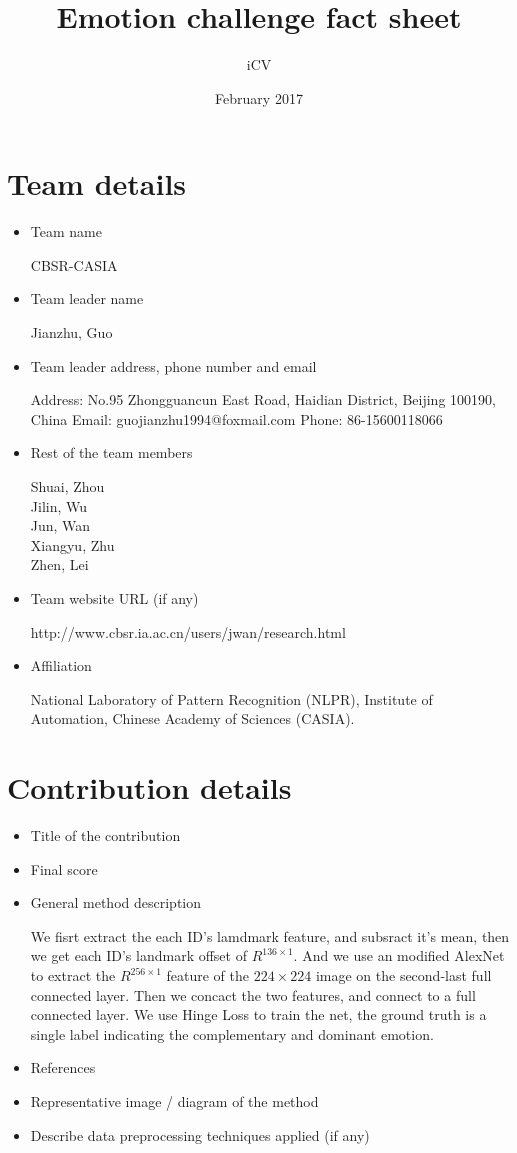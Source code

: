 \documentclass{article}
\title{Emotion challenge fact sheet}
\author{iCV}
\date{February 2017}
\begin{document}
\maketitle

\section{Team details}

\begin{itemize}
\item Team name

CBSR-CASIA

\item Team leader name

Jianzhu, Guo
\item Team leader address, phone number and email

Address: No.95 Zhongguancun East Road, Haidian District, Beijing 100190, China
Email: guojianzhu1994@foxmail.com
Phone: 86-15600118066
\item Rest of the team members

Shuai, Zhou \\
Jilin, Wu \\
Jun, Wan \\
Xiangyu, Zhu \\
Zhen, Lei 
\item Team website URL (if any)

http://www.cbsr.ia.ac.cn/users/jwan/research.html 
\item Affiliation

National Laboratory of Pattern Recognition (NLPR), Institute of Automation, Chinese Academy of Sciences (CASIA).
\end{itemize}

\section{Contribution details}

\begin{itemize}
\item Title of the contribution
\item Final score
\item General method description

We fisrt extract the each ID's lamdmark feature, and subsract it's mean, then we get each ID's landmark offset of $R^{136\times1}$. And we use an modified AlexNet to extract the $R^{256\times1}$ feature of the $224\times224$ image on the second-last full connected layer. Then we concact the two features, and connect to a full connected layer. We use Hinge Loss to train the net, the ground truth is a single label indicating the complementary and dominant emotion.
\item References
\item Representative image / diagram of the method
\item Describe data preprocessing techniques applied (if any)
\end{itemize}
\end{document}
